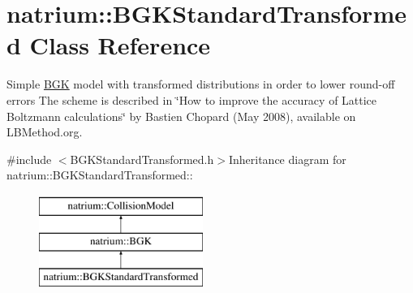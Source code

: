 \hypertarget{classnatrium_1_1BGKStandardTransformed}{
\section{natrium::BGKStandardTransformed Class Reference}
\label{classnatrium_1_1BGKStandardTransformed}
}


Simple \hyperlink{classnatrium_1_1BGK}{BGK} model with transformed distributions in order to lower round-\/off errors The scheme is described in \char`\"{}How to improve the accuracy of Lattice Boltzmann calculations\char`\"{} by Bastien Chopard (May 2008), available on LBMethod.org.  


{\ttfamily \#include $<$BGKStandardTransformed.h$>$}Inheritance diagram for natrium::BGKStandardTransformed::\begin{figure}[H]
\begin{center}
\leavevmode
\includegraphics[height=3cm]{classnatrium_1_1BGKStandardTransformed}
\end{center}
\end{figure}
